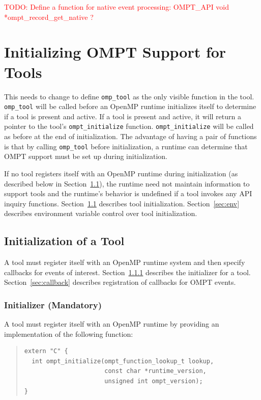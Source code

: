 \documentclass{article}
\begin{document}
\textcolor{red}{TODO: Define a function for native event processing: OMPT\_API void *ompt\_record\_get\_native ?}

\section{Initializing OMPT Support for Tools}
\label{sec:enabling}

{\color{red} This needs to change to define \verb|omp_tool| as the only visible function in the tool. \verb|omp_tool|  will be called before an OpenMP runtime initializes itself to determine if a tool is present and active. If a tool is present and active, it will return a pointer to the tool's \verb|ompt_initialize|  function. \verb|ompt_initialize|  will be called as before at the end of initialization. The advantage of having a pair of functions is that by calling \verb|omp_tool|  before initialization, a runtime can determine that OMPT support must be set up during initialization.}

If no tool registers itself with an OpenMP runtime during initialization (as described below in Section~\ref{sec:init}), the runtime need not maintain information to support tools 
and the runtime's behavior is undefined if a tool invokes any API inquiry functions.
Section~\ref{sec:init} describes tool initialization. 
Section~\ref{sec:env} describes environment variable control over tool initialization. 

\subsection{Initialization of a Tool}
\label{sec:init}

A tool must register itself with an OpenMP runtime system and then specify callbacks for events of interest. 
Section~\ref{sec:initialize} describes the initializer for a  tool. 
Section~\ref{sec:callback} describes registration of callbacks for OMPT events.
\subsubsection{Initializer (Mandatory)}
\label{sec:initialize} 

A   tool  must register itself with an OpenMP runtime by providing an implementation of the following function:

\begin{quote}
\begin{verbatim}
extern "C" {
  int ompt_initialize(ompt_function_lookup_t lookup, 
                      const char *runtime_version, 
                      unsigned int ompt_version);
}
\end{verbatim}
\end{quote}
\end{document}
